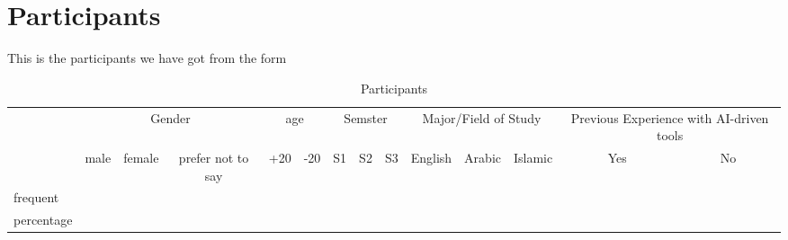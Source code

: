 \section{Participants}
This is the participants we have got from the form
\begin{table}[htbp]
	\caption{Participants}
	\centering
	\begin{tabular}{l|lll|ll|lll|lll|ll|}
		\cline{2-14}
		                                 & \multicolumn{3}{c|}{Gender} & \multicolumn{2}{c|}{age}    & \multicolumn{3}{c|}{Semster}           & \multicolumn{3}{c|}{Major/Field of Study} & \multicolumn{2}{c|}{Previous Experience with AI-driven tools}                                                                                                                                                                                                                                \\ \cline{2-14}
		                                 & \multicolumn{1}{c|}{male}   & \multicolumn{1}{c|}{female} & \multicolumn{1}{c|}{prefer not to say} & \multicolumn{1}{c|}{+20}                  & \multicolumn{1}{c|}{-20}                                      & \multicolumn{1}{c|}{S1} & \multicolumn{1}{c|}{S2} & \multicolumn{1}{c|}{S3} & \multicolumn{1}{c|}{English} & \multicolumn{1}{c|}{Arabic} & \multicolumn{1}{c|}{Islamic} & \multicolumn{1}{c|}{Yes} & \multicolumn{1}{c|}{No} \\ \hline
		\multicolumn{1}{|l|}{frequent}   & \multicolumn{1}{l|}{}       & \multicolumn{1}{l|}{}       &                                        & \multicolumn{1}{l|}{}                     &                                                               & \multicolumn{1}{l|}{}   & \multicolumn{1}{l|}{}   &                         & \multicolumn{1}{l|}{}        & \multicolumn{1}{l|}{}       &                              & \multicolumn{1}{l|}{}    &                         \\ \hline
		\multicolumn{1}{|l|}{percentage} & \multicolumn{1}{l|}{}       & \multicolumn{1}{l|}{}       &                                        & \multicolumn{1}{l|}{}                     &                                                               & \multicolumn{1}{l|}{}   & \multicolumn{1}{l|}{}   &                         & \multicolumn{1}{l|}{}        & \multicolumn{1}{l|}{}       &                              & \multicolumn{1}{l|}{}    &                         \\ \hline
	\end{tabular}
\end{table}
